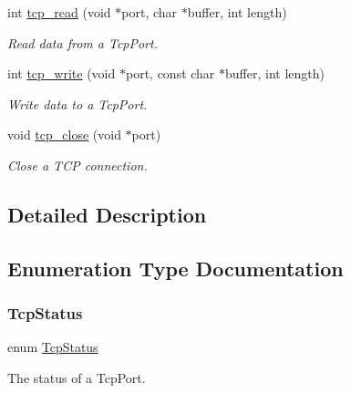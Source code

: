 \begin{DoxyCompactItemize}
int \hyperlink{group__tcp_ga81c323618e59f27c9fd8921a08a75b8c}{tcp\+\_\+read} (void $\ast$port, char $\ast$buffer, int length)
\begin{DoxyCompactList}\small\item\em Read data from a Tcp\+Port. \end{DoxyCompactList}\item 
int \hyperlink{group__tcp_gaa8742e37aea8e8925a5cb1ac8fa93766}{tcp\+\_\+write} (void $\ast$port, const char $\ast$buffer, int length)
\begin{DoxyCompactList}\small\item\em Write data to a Tcp\+Port. \end{DoxyCompactList}\item 
void \hyperlink{group__tcp_gad6e94cc6e0319629b8b1dd2cfab0ca48}{tcp\+\_\+close} (void $\ast$port)
\begin{DoxyCompactList}\small\item\em Close a T\+CP connection. \end{DoxyCompactList}\end{DoxyCompactItemize}


\subsection{Detailed Description}


\subsection{Enumeration Type Documentation}
\mbox{\label{group__tcp_gad2e85a3151cfb7e79fcba1dc40813da1}} 
\subsubsection{\texorpdfstring{Tcp\+Status}{TcpStatus}}
{\footnotesize\ttfamily enum \hyperlink{group__tcp_gad2e85a3151cfb7e79fcba1dc40813da1}{Tcp\+Status}}



The status of a Tcp\+Port. 

